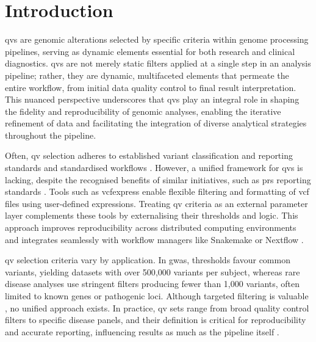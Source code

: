 \documentclass[unnumsec,webpdf,contemporary,large,namedate]{oup-authoring-template}
\begin{document}
\maketitle

\section{Introduction}
\label{sec:intro}
\ac{qv}s are genomic alterations selected by specific criteria within genome processing pipelines, serving as dynamic elements essential for both research and clinical diagnostics. 
\ac{qv}s are not merely static filters applied at a single step in an analysis pipeline; rather, they are dynamic, multifaceted elements that permeate the entire workflow, from initial data quality control to final result interpretation. This nuanced perspective underscores that \ac{qv}s play an integral role in shaping the fidelity and reproducibility of genomic analyses, enabling the iterative refinement of data and facilitating the integration of diverse analytical strategies throughout the pipeline.

Often, \ac{qv} selection adheres to established variant classification and reporting standards \citep{richards2015standards, li2017standards, li2017intervar, riggs2020technical, tavtigian2020fitting} and standardised workflows \citep{pedersen2021effective, anderson2010data, 2021uffelmannGenomewideAssociationStudies}. 
However, a unified framework for \ac{qv}s is lacking, despite the recognised benefits of similar initiatives, such as \ac{prs} reporting standards \citep{wand2021improving, lambert2021polygenic}.
Tools such as vcfexpress \citep{pedersen_vcfexpress_2025} enable flexible filtering and formatting of \ac{vcf} files using user-defined expressions. Treating \ac{qv} criteria as an external parameter layer complements these tools by externalising their thresholds and logic. This approach improves reproducibility across distributed computing environments \citep{bal_programming_1989} and integrates seamlessly with workflow managers like Snakemake \citep{molder_sustainable_2021} or Nextflow \citep{di_tommaso_nextflow_2017}.

\ac{qv} selection criteria vary by application. In \ac{gwas}, thresholds favour common variants, yielding datasets with over 500{,}000 variants per subject, whereas rare disease analyses use stringent filters producing fewer than 1{,}000 variants, often limited to known genes or pathogenic loci. Although targeted filtering is valuable \citep{povysil2019rare, cirulli2015exome}, no unified approach exists. In practice, \ac{qv} sets range from broad quality control filters to specific disease panels, and their definition is critical for reproducibility and accurate reporting, influencing results as much as the pipeline itself \citep{olson2023variant}.
\end{document}
